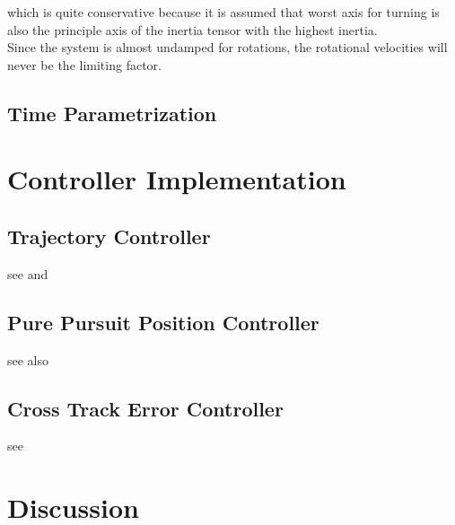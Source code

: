 which is quite conservative because it is assumed that worst axis for turning is also the principle axis of the inertia tensor with the highest inertia.\\

Since the system is almost undamped for rotations, the rotational velocities will never be the limiting factor.

\subsection{Time Parametrization}

\section{Controller Implementation}
\label{sec:controllerImplementation}
\subsection{Trajectory Controller}
see \cite{snider} and \cite{deluca}
\subsection{Pure Pursuit Position Controller}
see also \cite{snider}
\subsection{Cross Track Error Controller}
see \cite{williams}

\section{Discussion}
\label{sec:discussion}

